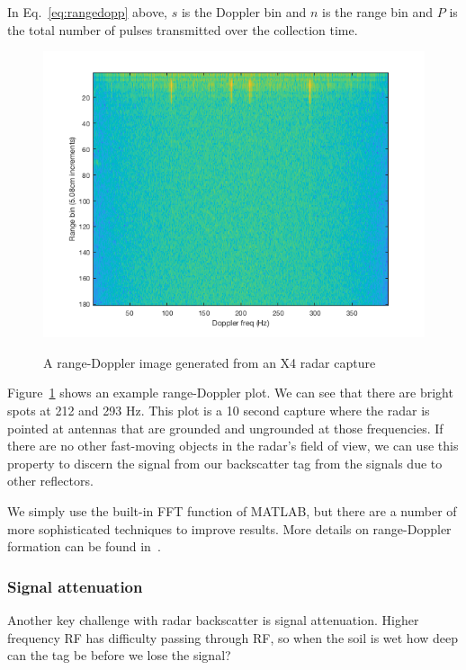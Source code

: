 \documentclass[12pt]{article}
\begin{document}
In Eq.~\ref{eq:rangedopp} above, $s$ is the Doppler bin and $n$ is
the range bin and $P$ is the total number of pulses transmitted over
the collection time. 

\begin{figure}[h!]
  \centering
  \includegraphics[scale=0.5]{rangedoppler.png}\\
  \caption{A range-Doppler image generated from an X4 radar capture}
  \label{figure:rdplot}
\end{figure}

Figure~\ref{figure:rdplot} shows an example range-Doppler plot. We can
see that there are bright spots at 212 and 293 Hz. This plot is a 10
second capture where the radar is pointed at antennas that are
grounded and ungrounded at those frequencies. If there are no other
fast-moving objects in the radar's field of view, we can use this
property to discern the signal from our backscatter tag from the
signals due to other reflectors.

We simply use the built-in FFT function of MATLAB, but there are a
number of more sophisticated techniques to improve results. More
details on range-Doppler formation can be found
in~\cite{rangeDoppler}.

\subsubsection*{Signal attenuation}

Another key challenge with radar backscatter is signal
attenuation. Higher frequency RF has difficulty passing through RF, so
when the soil is wet how deep can the tag be before we lose the
signal?
\end{document}
